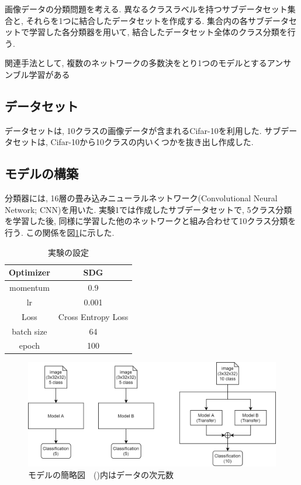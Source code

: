 \documentclass[twocolumn]{jarticle}     %
\begin{document}
画像データの分類問題を考える.
異なるクラスラベルを持つサブデータセット集合と, それらを1つに結合したデータセットを作成する.
集合内の各サブデータセットで学習した各分類器を用いて, 結合したデータセット全体のクラス分類を行う.

関連手法として, 複数のネットワークの多数決をとり1つのモデルとするアンサンブル学習がある

\subsection{データセット}
データセットは, 10クラスの画像データが含まれるCifar-10\cite{cifar10}を利用した.
サブデータセットは, Cifar-10から10クラスの内いくつかを抜き出し作成した.

\subsection{モデルの構築}
分類器には, 16層の畳み込みニューラルネットワーク(Convolutional Neural Network; CNN)を用いた.
実験1では作成したサブデータセットで, 5クラス分類を学習した後, 同様に学習した他のネットワークと組み合わせて10クラス分類を行う. この関係を図\ref{fig:model}に示した.

\begin{table}[tb]
  \begin{center}
    \caption{実験の設定}
    \begin{tabular}{|c|c|} \hline
      Optimizer & SDG \\ \hline
      momentum & 0.9 \\ \hline
      lr & 0.001 \\ \hline
      Loss & Cross Entropy Loss \\ \hline
      batch size & 64 \\ \hline
      epoch & 100 \\ \hline
    \end{tabular}
    \label{tab:setting}
  \end{center}
\end{table}

\begin{figure}[t]
	\begin{center}
		\includegraphics[clip,width=16cm]{model_figure.png}
		\caption{モデルの簡略図　()内はデータの次元数}
		\label{fig:model}
	\end{center}
\end{figure}
\end{document}
